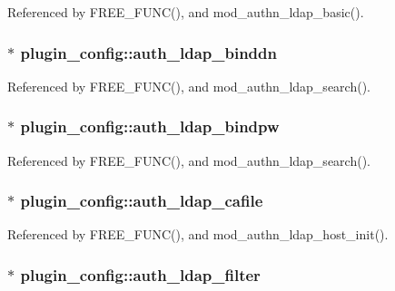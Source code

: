 Referenced by F\-R\-E\-E\-\_\-\-F\-U\-N\-C(), and mod\-\_\-authn\-\_\-ldap\-\_\-basic().

\hypertarget{structplugin__config_a0c4f44a8422dea547c77d190b4d50e02}{
\subsubsection[{auth\-\_\-ldap\-\_\-binddn}]{$\ast$ plugin\-\_\-config\-::auth\-\_\-ldap\-\_\-binddn}}\label{structplugin__config_a0c4f44a8422dea547c77d190b4d50e02}


Referenced by F\-R\-E\-E\-\_\-\-F\-U\-N\-C(), and mod\-\_\-authn\-\_\-ldap\-\_\-search().

\hypertarget{structplugin__config_aa0a3061a07781bb55d7a63b24a2dfc9c}{
\subsubsection[{auth\-\_\-ldap\-\_\-bindpw}]{$\ast$ plugin\-\_\-config\-::auth\-\_\-ldap\-\_\-bindpw}}\label{structplugin__config_aa0a3061a07781bb55d7a63b24a2dfc9c}


Referenced by F\-R\-E\-E\-\_\-\-F\-U\-N\-C(), and mod\-\_\-authn\-\_\-ldap\-\_\-search().

\hypertarget{structplugin__config_aa52340515c657d0e7c213f8395e747b3}{
\subsubsection[{auth\-\_\-ldap\-\_\-cafile}]{$\ast$ plugin\-\_\-config\-::auth\-\_\-ldap\-\_\-cafile}}\label{structplugin__config_aa52340515c657d0e7c213f8395e747b3}


Referenced by F\-R\-E\-E\-\_\-\-F\-U\-N\-C(), and mod\-\_\-authn\-\_\-ldap\-\_\-host\-\_\-init().

\hypertarget{structplugin__config_ada10c83dc0b92eafedb358392d279af5}{
\subsubsection[{auth\-\_\-ldap\-\_\-filter}]{$\ast$ plugin\-\_\-config\-::auth\-\_\-ldap\-\_\-filter}}\label{structplugin__config_ada10c83dc0b92eafedb358392d279af5}


